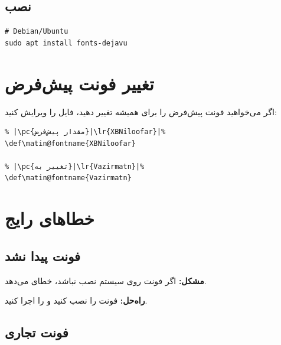 \subsection{نصب }
\label{sec:fonts-install-dejavu}

\begin{latin}
\begin{verbatim}
# Debian/Ubuntu
sudo apt install fonts-dejavu
\end{verbatim}
\end{latin}


\section{تغییر فونت پیش‌فرض}
\label{sec:fonts-change-default}

اگر می‌خواهید فونت پیش‌فرض را برای همیشه
تغییر دهید، فایل  را
ویرایش کنید:

\begin{latin}
\begin{verbatim}
% |\pc{مقدار پیش‌فرض}|\lr{XBNiloofar}|%
\def\matin@fontname{XBNiloofar}

% |\pc{تغییر به}|\lr{Vazirmatn}|%
\def\matin@fontname{Vazirmatn}
\end{verbatim}
\end{latin}


\section{خطاهای رایج}
\label{sec:fonts-mistakes}

\subsection{فونت پیدا نشد}
\label{sec:fonts-mistake-notfound}

\textbf{مشکل:} اگر فونت روی سیستم نصب نباشد،
خطای  می‌دهد.

\textbf{راه‌حل:} فونت را نصب کنید و
 را اجرا کنید.

\subsection{فونت تجاری}
\label{sec:fonts-mistake-commercial}

